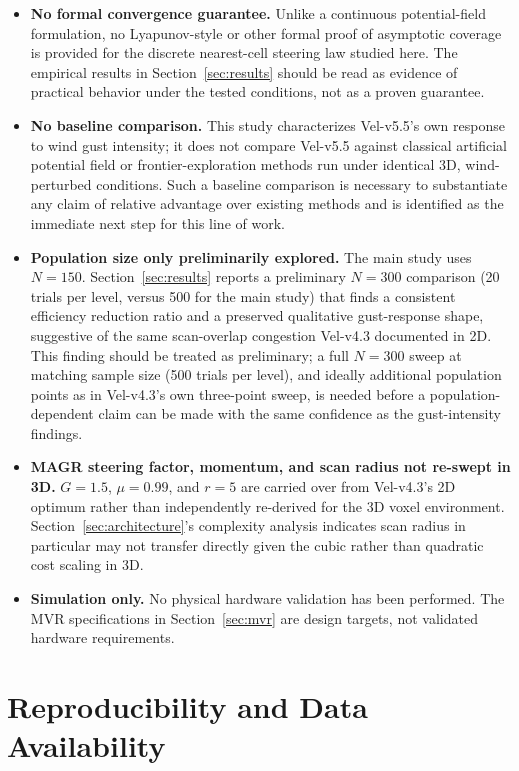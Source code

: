 \documentclass[10pt,journal]{IEEEtran}
\begin{document}
\begin{itemize}
\item \textbf{No formal convergence guarantee.} Unlike a continuous
potential-field formulation, no Lyapunov-style or other formal proof of
asymptotic coverage is provided for the discrete nearest-cell steering law
studied here. The empirical results in Section~\ref{sec:results} should be
read as evidence of practical behavior under the tested conditions, not as
a proven guarantee.
\item \textbf{No baseline comparison.} This study characterizes Vel-v5.5's
own response to wind gust intensity; it does not compare Vel-v5.5 against
classical artificial potential field or frontier-exploration methods run
under identical 3D, wind-perturbed conditions. Such a baseline comparison
is necessary to substantiate any claim of relative advantage over existing
methods and is identified as the immediate next step for this line of work.
\item \textbf{Population size only preliminarily explored.} The main study
uses $N=150$. Section~\ref{sec:results} reports a preliminary $N=300$
comparison (20 trials per level, versus 500 for the main study) that finds
a consistent efficiency reduction ratio and a preserved qualitative
gust-response shape, suggestive of the same scan-overlap congestion
Vel-v4.3 documented in 2D. This finding should be treated as preliminary;
a full $N=300$ sweep at matching sample size (500 trials per level), and
ideally additional population points as in Vel-v4.3's own three-point
sweep, is needed before a population-dependent claim can be made with the
same confidence as the gust-intensity findings.
\item \textbf{MAGR steering factor, momentum, and scan radius not
re-swept in 3D.} $G=1.5$, $\mu=0.99$, and $r=5$ are carried over from
Vel-v4.3's 2D optimum rather than independently re-derived for the 3D
voxel environment. Section~\ref{sec:architecture}'s complexity analysis
indicates scan radius in particular may not transfer directly given the
cubic rather than quadratic cost scaling in 3D.
\item \textbf{Simulation only.} No physical hardware validation has been
performed. The MVR specifications in Section~\ref{sec:mvr} are design
targets, not validated hardware requirements.
\end{itemize}

\section{Reproducibility and Data Availability}
\label{sec:repro}
\end{document}

